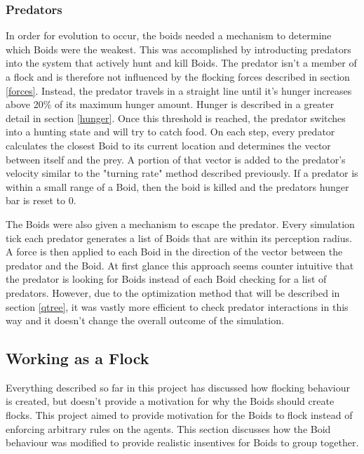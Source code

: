 \documentclass{egpubl}
\begin{document}
\subsubsection{Predators}
\label{hunting}
In order for evolution to occur, the boids needed a mechanism to determine which Boids were the weakest. This was accomplished by introducting predators into the system that actively hunt and kill Boids. The predator isn't a member of a flock and is therefore not influenced by the flocking forces described in section \ref{forces}. Instead, the predator travels in a straight line until it's hunger increases above 20\% of its maximum hunger amount. Hunger is described in a greater detail in section \ref{hunger}. Once this threshold is reached, the predator switches into a hunting state and will try to catch food. On each step, every predator calculates the closest Boid to its current location and determines the vector between itself and the prey. A portion of that vector is added to the predator's velocity similar to the "turning rate" method described previously. If a predator is within a small range of a Boid, then the boid is killed and the predators hunger bar is reset to 0. 
\par
The Boids were also given a mechanism to escape the predator. Every simulation tick each predator generates a list of Boids that are within its perception radius. A force is then applied to each Boid in the direction of the vector between the predator and the Boid. At first glance this approach seems counter intuitive that the predator is looking for Boids instead of each Boid checking for a list of predators. However, due to the optimization method that will be described in section \ref{qtree}, it was vastly more efficient to check predator interactions in this way and it doesn't change the overall outcome of the simulation.
\subsection{Working as a Flock}
Everything described so far in this project has discussed how flocking behaviour is created, but doesn't provide a motivation for why the Boids should create flocks. This project aimed to provide motivation for the Boids to flock instead of enforcing arbitrary rules on the agents. This section discusses how the Boid behaviour was modified to provide realistic insentives for Boids to group together.
\end{document}
